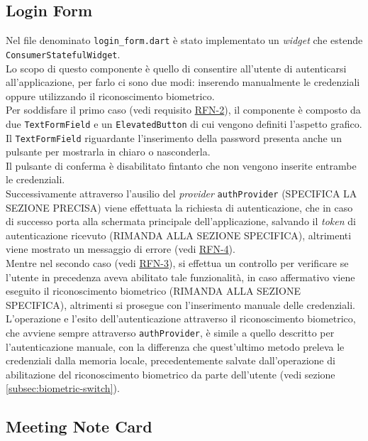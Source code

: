 \subsection{Login Form}
\label{subsec:login-form}

Nel file denominato \lstinline{login_form.dart} è stato implementato un \emph{widget} che estende \lstinline{ConsumerStatefulWidget}.\\
Lo scopo di questo componente è quello di consentire all'utente di autenticarsi all'applicazione, per farlo ci sono due modi: inserendo manualmente le credenziali oppure utilizzando il riconoscimento biometrico.\\
Per soddisfare il primo caso (vedi requisito \hyperref[RFN-2]{RFN-2}), il componente è composto da due \lstinline{TextFormField}\cite{site:text-form-field} e un \lstinline{ElevatedButton}\cite{site:elevated-button} di cui vengono definiti l'aspetto grafico.\\
Il \lstinline{TextFormField} riguardante l'inserimento della password presenta anche un pulsante per mostrarla in chiaro o nasconderla.\\
Il pulsante di conferma è disabilitato fintanto che non vengono inserite entrambe le credenziali.\\
Successivamente attraverso l'ausilio del \emph{provider} \lstinline{authProvider} (SPECIFICA LA SEZIONE PRECISA) viene effettuata la richiesta di autenticazione, che in caso di successo porta alla schermata principale dell'applicazione, salvando il \emph{token} di autenticazione ricevuto (RIMANDA ALLA SEZIONE SPECIFICA), altrimenti viene mostrato un messaggio di errore (vedi \hyperref[RFN-4]{RFN-4}).\\ 
Mentre nel secondo caso (vedi \hyperref[RFN-3]{RFN-3}), si effettua un controllo per verificare se l'utente in precedenza aveva abilitato tale funzionalità, in caso affermativo viene eseguito il riconoscimento biometrico (RIMANDA ALLA SEZIONE SPECIFICA), altrimenti si prosegue con l'inserimento manuale delle credenziali.\\
L'operazione e l'esito dell'autenticazione attraverso il riconoscimento biometrico, che avviene sempre attraverso \lstinline{authProvider}, è simile a quello descritto per l'autenticazione manuale, con la differenza che quest'ultimo metodo preleva le credenziali dalla memoria locale, precedentemente salvate dall'operazione di abilitazione del riconoscimento biometrico da parte dell'utente (vedi sezione \ref{subsec:biometric-switch}).

\subsection{Meeting Note Card}
\label{subsec:meeting-note-card}

